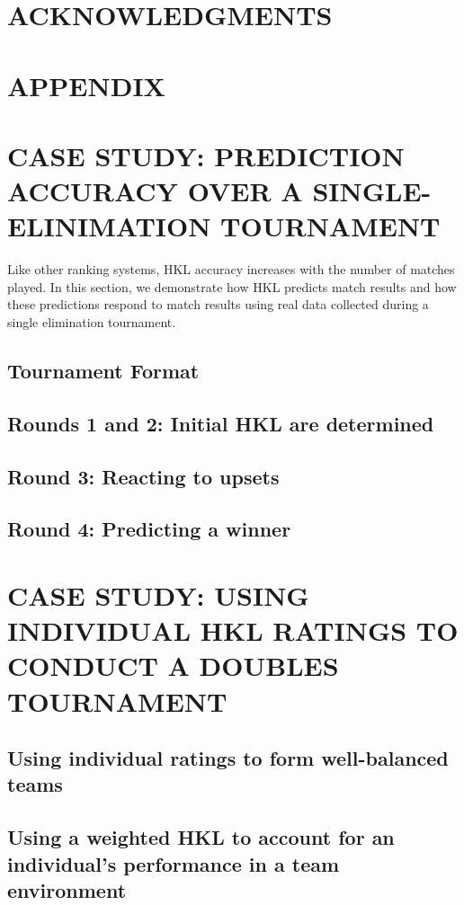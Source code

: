 \documentclass[letterpaper, 10 pt, conference]{ieeeconf}  %
\begin{document}
\section*{ACKNOWLEDGMENTS}


% 

\onecolumn
\section*{APPENDIX}
\setcounter{section}{0}

\section{CASE STUDY: PREDICTION ACCURACY OVER A SINGLE-ELINIMATION TOURNAMENT}
Like other ranking systems, HKL accuracy increases with the number of matches played.
In this section, we demonstrate how HKL predicts match results and how these predictions respond to match results using real data collected during a single elimination tournament.

\subsection{Tournament Format}

\subsection{Rounds 1 and 2: Initial HKL are determined}

\subsection{Round 3: Reacting to upsets}

\subsection{Round 4: Predicting a winner}

\section{CASE STUDY: USING INDIVIDUAL HKL RATINGS TO CONDUCT A DOUBLES TOURNAMENT}

\subsection{Using individual ratings to form well-balanced teams}
\subsection{Using a weighted HKL to account for an individual's performance in a team environment} 
\end{document}
